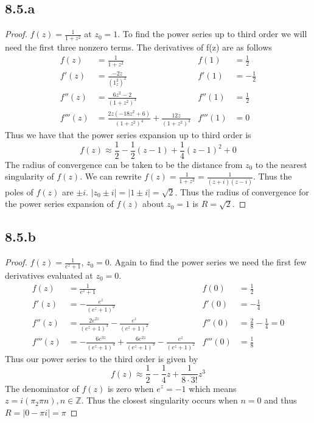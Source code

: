 \documentclass[a4paper, 11pt]{article}
\begin{document}
\subsection*{8.5.a} 
	\begin{proof}
		$f(z) = \frac{1}{1+z^2}$ at $z_0 = 1$. To find the power series up to third order we will need the first three nonzero terms. The derivatives of f(z) are as follows 
			\begin{align*}
				f(z) 	&= \frac{1}{1+z^2} & f(1) &= \frac{1}{2} \\ 
				f'(z) 	&= \frac{-2z}{(1_z^2)^2} & f'(1) &= -\frac{1}{2} \\ 
				f''(z) 	&= \frac{6z^2-2}{(1+z^2)^3} & f''(1) &= \frac{1}{2} \\ 
				f'''(z) &= \frac{2z(-18z^2+6)}{(1+z^2)^4}+\frac{12z}{(1+z^2)^3} & f'''(1) &= 0
			\end{align*}
		Thus we have that the power series expansion up to third order is 
			\begin{equation*}
				f(z) \approx \frac{1}{2}-\frac{1}{2}(z-1)+\frac{1}{4}(z-1)^2 + 0 
			\end{equation*}
		\noindent The radius of convergence can be taken to be the distance from $z_0$ to the nearest singularity of $f(z)$. We can rewrite $f(z) = \frac{1}{1+z^2} = \frac{1}{(z+i)(z-i)}$. Thus the poles of $f(z)$ are $\pm i$. $|z_0\pm i| = |1\pm i| = \sqrt{2}$. Thus the radius of convergence for the power series expansion of $f(z)$ about $z_0=1$ is $R=\sqrt{2}$. 
	\end{proof}	
	
	
\subsection*{8.5.b} 
	\begin{proof}
		$f(z) = \frac{1}{e^z+1}$, $z_0 = 0$. Again to find the power series we need the first few derivatives evaluated at $z_0 = 0$. 
			\begin{align*}
				f(z) &= \frac{1}{e^z+1} & f(0) &= \frac{1}{2} \\ 
				f'(z) &= -\frac{e^z}{(e^z+1)^2} & f'(0) &= -\frac{1}{4} \\ 
				f''(z) &= \frac{2e^{2z}}{(e^z+1)^3}-\frac{e^z}{(e^z+1)^2} & f''(0)&=\frac{2}{8}-\frac{1}{4}=0 \\ 
				f'''(z) &= -\frac{6e^{3z}}{(e^z+1)^4}+\frac{6e^{2z}}{(e^z+1)^3}-\frac{e^z}{(e^z+1)^2} & f'''(0)&= \frac{1}{8} 
			\end{align*}
		Thus our power series to the third order is given by 
			\begin{equation*}
				f(z) \approx \frac{1}{2} - \frac{1}{4}z + \frac{1}{8\cdot 3!}z^3 
			\end{equation*}
		The denominator of $f(z)$ is zero when $e^z = -1$ which means $z=i(\pi_2\pi n), n\in\mathbb{Z}$. Thus the closest singularity occurs when $n=0$ and thus $R = |0-\pi i| = \pi $
	\end{proof}
	
\end{document}
